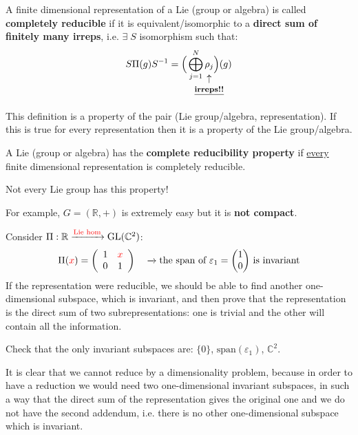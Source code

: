 \documentclass[../main.tex]{subfiles}
\begin{document}
\begin{definition}
A finite dimensional representation of a Lie (group or algebra) is called \textbf{completely reducible} if it is equivalent/isomorphic to a \textbf{direct sum of finitely many irreps}, i.e. $\exists\;S$ isomorphism such that:
\[
S\Pi(g)S^{-1}=\Big(\bigoplus_{j=1}^N\underset{\mathclap{\tikz \node {$\uparrow$} node [below=1ex] {\footnotesize \underline{\textbf{irreps!!}} };}} {\rho_{j}}\Big)(g)
\]
\end{definition}
This definition is a property of the pair (Lie group/algebra, representation). If this is true for every representation then it is a property of the Lie group/algebra.
\begin{definition}
A Lie (group or algebra) has the \textbf{complete reducibility property} if \underline{every} finite dimensional representation is completely reducible.
\end{definition}
{\selectfont{}\relax} Not every Lie group has this property! 
\begin{example}
For example, $G=(\mathbb{R},+)$ is extremely easy but it is \textbf{not compact}. 

Consider $\Pi:\mathbb{R}\xrightarrow[]{{\color{red}\text{Lie hom}}}\text{GL}(\mathbb{C}^2)$:
\[
\Pi({\color{red}x})=\left(\begin{array}{cc}
    1 & {\color{red}x} \\
    0 & 1
    \end{array}\right)\quad
\xrightarrow[]{} \text{the span of $\varepsilon_1=\begin{pmatrix}1\\0\end{pmatrix}$ is invariant}
\]
If the representation were reducible, we should be able to find another one-dimensional subspace, which is invariant, and then prove that the representation is the direct sum of two subrepresentations: one is trivial and the other will contain all the information.
\end{example}
\begin{exercise}
Check that the only invariant subspaces are: $\{0\}$, $\text{span}(\varepsilon_1)$, $\mathbb{C}^2$.
\end{exercise}
It is clear that we cannot reduce by a dimensionality problem, because in order to have a reduction we would need two one-dimensional invariant subspaces, in such a way that the direct sum of the representation gives the original one and we do not have the second addendum, i.e. there is no other one-dimensional subspace which is invariant.
\end{document}
